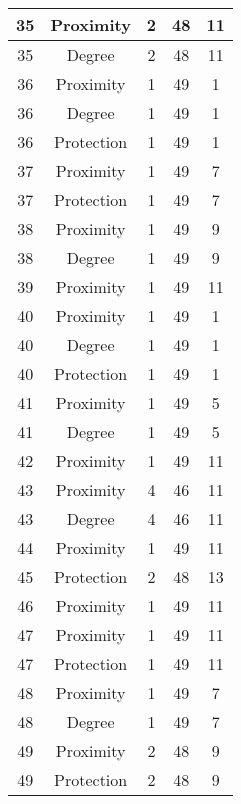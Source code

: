 \documentclass[results.tex]{subfiles}
\begin{document}
\begin{center}
\begin{tabular}{| c || c | c | c | c |}
    \hline
    35 & Proximity & 2 & 48 & 11 \\ 
    \hline
    35 & Degree & 2 & 48 & 11 \\ 
    \hline
    36 & Proximity & 1 & 49 & 1 \\ 
    \hline
    36 & Degree & 1 & 49 & 1 \\ 
    \hline
    36 & Protection & 1 & 49 & 1 \\ 
    \hline
    37 & Proximity & 1 & 49 & 7 \\ 
    \hline
    37 & Protection & 1 & 49 & 7 \\ 
    \hline
    38 & Proximity & 1 & 49 & 9 \\ 
    \hline
    38 & Degree & 1 & 49 & 9 \\ 
    \hline
    39 & Proximity & 1 & 49 & 11 \\ 
    \hline
    40 & Proximity & 1 & 49 & 1 \\ 
    \hline
    40 & Degree & 1 & 49 & 1 \\ 
    \hline
    40 & Protection & 1 & 49 & 1 \\ 
    \hline
    41 & Proximity & 1 & 49 & 5 \\ 
    \hline
    41 & Degree & 1 & 49 & 5 \\ 
    \hline
    42 & Proximity & 1 & 49 & 11 \\ 
    \hline
    43 & Proximity & 4 & 46 & 11 \\ 
    \hline
    43 & Degree & 4 & 46 & 11 \\ 
    \hline
    44 & Proximity & 1 & 49 & 11 \\ 
    \hline
    45 & Protection & 2 & 48 & 13 \\ 
    \hline
    46 & Proximity & 1 & 49 & 11 \\ 
    \hline
    47 & Proximity & 1 & 49 & 11 \\ 
    \hline
    47 & Protection & 1 & 49 & 11 \\ 
    \hline
    48 & Proximity & 1 & 49 & 7 \\ 
    \hline
    48 & Degree & 1 & 49 & 7 \\ 
    \hline
    49 & Proximity & 2 & 48 & 9 \\ 
    \hline
    49 & Protection & 2 & 48 & 9 \\ 
    \hline   \end{tabular}
\end{center}
\end{document}
